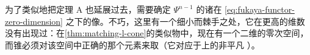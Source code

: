 \begin{remark}\label{thm:zero-dimensional-extension}
为了类似地把定理 A 也延展过去，需要确定 $\Psi^{n-1}$ 的诸\trVanishingCycle{}在 \eqref{eq:fukaya-functor-zero-dimension} 之下的像。不巧，这里有一个细小而棘手之处，它在更高的维数没有出现过：在\cref{thm:matching-l-cone}的类似物中，现在有一个二维的零次\trMorphism{}空间，而锥必须对该空间中正确的那个元素来取（它对应于\trVanishingCycle{}上的非平凡 \trPinStructure）。
\end{remark}
